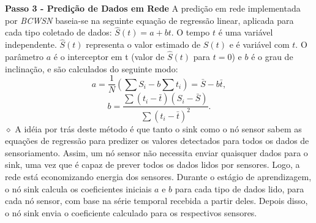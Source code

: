 \documentclass{acm_proc_article-sp}
\newcommand{\dia}{\hspace*{.1cm} \hfill $\diamond$}
\begin{document}
{\bf Passo 3 - Predição de Dados em Rede}
A predição em rede implementada por {\it BCWSN} baseia-se na 
seguinte equação de regressão linear, aplicada para cada tipo coletado de dados:
$\hat{S}(t) = a + bt$.
O tempo $t$ é uma variável independente. $\hat{S}(t)$ representa o valor estimado 
de $S(t) $ e é variável com $t$. O parâmetro $a$ é o interceptor em t 
(valor de $\hat{S}(t)$ para $t=0$) e $b$ é o grau de inclinação, e são calculados 
do seguinte modo:
\begin{equation}
\label{coef-a}
	a = \frac{1}{N}\left(\sum S_{i} - b\sum t_{i} \right) = \bar{S} - b\bar{t},
\end{equation}
\vspace*{-.3cm}
\begin{equation}
\label{coef-b}
	b = \frac{\sum \left(t_{i} - \bar{t}\right)\left(S_{i} - \bar{S}\right)}{\sum \left(t_{i} - \bar{t}\right)^{2}}.
\end{equation}
	\dia
\vspace*{-.4cm}
A idéia por trás deste método é que tanto o sink como o nó sensor sabem as
equações de regressão para predizer os valores detectados para todos os dados de
sensoriamento. Assim, um nó sensor não necessita enviar quaisquer dados para o
sink, uma vez que é capaz de prever todos os dados lidos por sensores. Logo, a
rede está economizando energia dos sensores\cite{MaiaACR2013}.
\vspace*{-.3cm}
Durante o estágio de aprendizagem, o nó sink calcula os coeficientes
iniciais $a$ e $b$ para cada tipo de dados lido, para cada nó sensor,
com base na série temporal recebida a partir deles. Depois disso,
o nó sink envia o coeficiente calculado para os respectivos sensores.
\vspace*{-.3cm}
\end{document}
